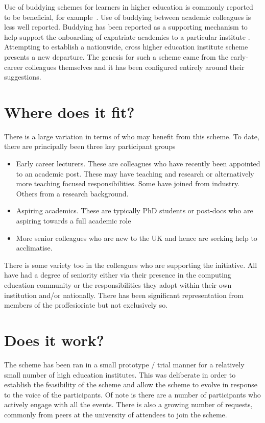 \documentclass[sigconf]{acmart}
\begin{document}
Use of buddying schemes for learners in higher education is commonly reported to be beneficial, for example~\cite{Hayes2020,May20}. Use of buddying between academic colleagues is less well reported. Buddying has been reported as a supporting mechanism to help support the onboarding of expatriate academics to a particular institute \cite{Wilkins2019}. Attempting to establish a nationwide, cross higher education institute scheme presents a new departure. The genesis for such a scheme came from the early-career colleagues themselves and it has been configured entirely around their suggestions.
	
\section{Where does it fit?}
There is a large variation in terms of who may benefit from this scheme. To date, there are principally been three key participant groups
\begin{itemize}
	\item Early career lecturers. These are colleagues who have recently been appointed to an academic post. These may have teaching and research or alternatively more teaching focused responsibilities. Some have joined from industry. Others from a research background.
	\item Aspiring academics. These are typically PhD students or post-docs who are aspiring towards a full academic role
	\item More senior colleagues who are new to the UK and hence are seeking help to acclimatise.
\end{itemize}

There is some variety too in the colleagues who are supporting the initiative. All have had a degree of seniority either via their presence in the computing education community or the responsibilities they adopt within their own institution and/or nationally. There has been significant representation from members of the proffesioriate but not exclusively so.





\section{Does it work?}	
\label{Sec:DoesItWork}
The scheme has been ran in a small prototype / trial manner for a relatively small number of high education institutes. This was deliberate in order to establish the feasibility of the scheme and allow the scheme to evolve in response to the voice of the participants. Of note is there are a number of participants who actively engage with all the events. There is also a growing number of requests, commonly from peers at the university of attendees to join the scheme.
\end{document}
